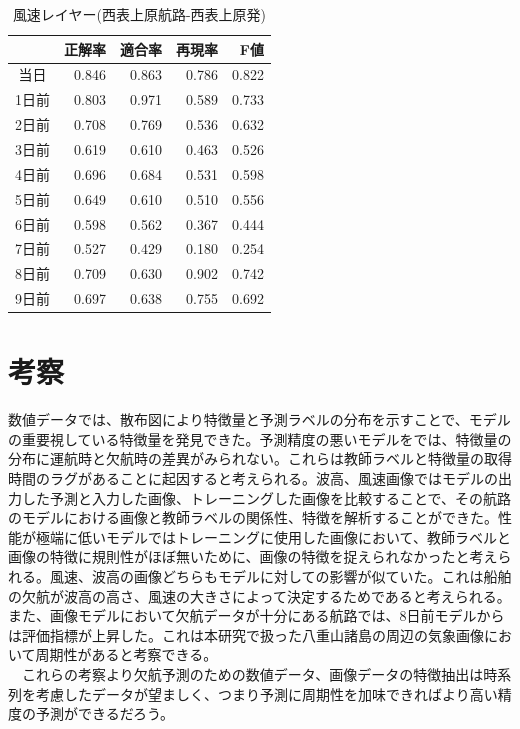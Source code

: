 \documentclass[twocolumn,twoside,9.5pt]{jsarticle}
\begin{document}
\begin{table}[H]
  \begin{center}
    \caption{風速レイヤー(西表上原航路-西表上原発)}
    \begin{tabular}{|c|r|r|r|r|} \hline
   &正解率 & 適合率 & 再現率 & F値 \\ \hline
      当日 & 0.846 & 0.863 & 0.786 & 0.822 \\ \hline
     1日前 & 0.803 & 0.971 & 0.589 & 0.733 \\ \hline
      2日前 & 0.708 & 0.769 & 0.536 & 0.632 \\ \hline
      3日前 & 0.619 & 0.610 & 0.463 & 0.526 \\ \hline 
      4日前 & 0.696 & 0.684 & 0.531 & 0.598 \\ \hline 
      5日前 & 0.649 & 0.610 & 0.510 & 0.556 \\ \hline 
      6日前 & 0.598 & 0.562 & 0.367 & 0.444 \\ \hline 
      7日前 & 0.527 & 0.429 & 0.180 & 0.254 \\ \hline 
      8日前 & 0.709 & 0.630 & 0.902 & 0.742 \\ \hline 
      9日前 & 0.697 & 0.638 & 0.755 & 0.692 \\ \hline 
    \end{tabular}    
    \label{img_wind_iriue}
  \end{center}
\end{table}


\section{考察}
数値データでは、散布図により特徴量と予測ラベルの分布を示すことで、モデルの重要視している特徴量を発見できた。予測精度の悪いモデルをでは、特徴量の分布に運航時と欠航時の差異がみられない。これらは教師ラベルと特徴量の取得時間のラグがあることに起因すると考えられる。波高、風速画像ではモデルの出力した予測と入力した画像、トレーニングした画像を比較することで、その航路のモデルにおける画像と教師ラベルの関係性、特徴を解析することができた。性能が極端に低いモデルではトレーニングに使用した画像において、教師ラベルと画像の特徴に規則性がほぼ無いために、画像の特徴を捉えられなかったと考えられる。風速、波高の画像どちらもモデルに対しての影響が似ていた。これは船舶の欠航が波高の高さ、風速の大きさによって決定するためであると考えられる。また、画像モデルにおいて欠航データが十分にある航路では、8日前モデルからは評価指標が上昇した。これは本研究で扱った八重山諸島の周辺の気象画像において周期性があると考察できる。
\\　これらの考察より欠航予測のための数値データ、画像データの特徴抽出は時系列を考慮したデータが望ましく、つまり予測に周期性を加味できればより高い精度の予測ができるだろう。
\end{document}
